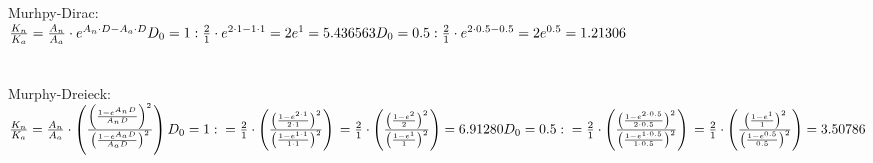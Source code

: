 \documentclass[a4paper]{scrartcl}
\begin{document}
Murhpy-Dirac:\\
$
\frac{K_n}{K_a} = \frac{A_n}{A_a} \cdot e^{A_n \cdot D - A_a \cdot D}\\
~\\
D_0 = 1:\\
\frac{2}{1} \cdot e^{2 \cdot 1 - 1 \cdot 1} = 2e^1 = 5.436563\\
\\
D_0 = 0.5:\\
\frac{2}{1} \cdot e^{2 \cdot 0.5 - 0.5} = 2e^{0.5} = 1.21306
$\\\\
~\\
Murphy-Dreieck:\\
$
\frac{K_n}{K_a} = \frac{A_n}{A_a} \cdot \left(
	\frac{
		\left(\frac{1-e^{A_nD}}{A_nD}\right)^2
	}
{
	\left(\frac{1-e^{A_aD}}{A_aD}\right)^2
}
\right)\\
D_0 = 1:\\
= \frac{2}{1} \cdot \left(
\frac{
	\left(\frac{1-e^{2 \cdot 1}}{2 \cdot 1}\right)^2
}
{
	\left(\frac{1-e^{1 \cdot 1}}{1 \cdot 1}\right)^2
}
\right)\\
= \frac{2}{1} \cdot \left(
\frac{
	\left(\frac{1-e^{2}}{2}\right)^2
}
{
	\left(\frac{1-e^{1}}{1}\right)^2
}
\right)=6.91280
\\\\
~\\
D_0 = 0.5:\\
= \frac{2}{1} \cdot \left(
\frac{
	\left(\frac{1-e^{2 \cdot 0.5}}{2 \cdot 0.5}\right)^2
}
{
	\left(\frac{1-e^{1 \cdot 0.5}}{1 \cdot 0.5}\right)^2
}
\right)\\
= \frac{2}{1} \cdot \left(
\frac{
	\left(\frac{1-e^{1}}{1}\right)^2
}
{
	\left(\frac{1-e^{0.5}}{0.5}\right)^2
}
\right)= 3.50786
$
\end{document}
